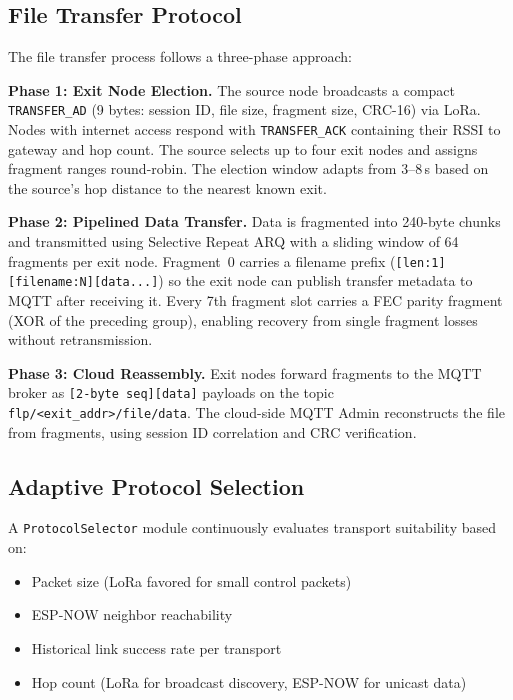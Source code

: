 \documentclass[conference]{IEEEtran}
\begin{document}
\subsection{File Transfer Protocol}

The file transfer process follows a three-phase approach:

\textbf{Phase 1: Exit Node Election.} The source node broadcasts a compact \texttt{TRANSFER\_AD} (9 bytes: session ID, file size, fragment size, CRC-16) via LoRa. Nodes with internet access respond with \texttt{TRANSFER\_ACK} containing their RSSI to gateway and hop count. The source selects up to four exit nodes and assigns fragment ranges round-robin. The election window adapts from 3--8\,s based on the source's hop distance to the nearest known exit.

\textbf{Phase 2: Pipelined Data Transfer.} Data is fragmented into 240-byte chunks and transmitted using Selective Repeat ARQ with a sliding window of 64 fragments per exit node. Fragment~0 carries a filename prefix (\texttt{[len:1][filename:N][data...]}) so the exit node can publish transfer metadata to MQTT after receiving it. Every 7th fragment slot carries a FEC parity fragment (XOR of the preceding group), enabling recovery from single fragment losses without retransmission.

\textbf{Phase 3: Cloud Reassembly.} Exit nodes forward fragments to the MQTT broker as \texttt{[2-byte seq][data]} payloads on the topic \texttt{flp/<exit\_addr>/file/data}. The cloud-side MQTT Admin reconstructs the file from fragments, using session ID correlation and CRC verification.

\subsection{Adaptive Protocol Selection}

A \texttt{ProtocolSelector} module continuously evaluates transport suitability based on:

\begin{itemize}
  \item Packet size (LoRa favored for small control packets)
  \item ESP-NOW neighbor reachability
  \item Historical link success rate per transport
  \item Hop count (LoRa for broadcast discovery, ESP-NOW for unicast data)
\end{itemize}
\end{document}
